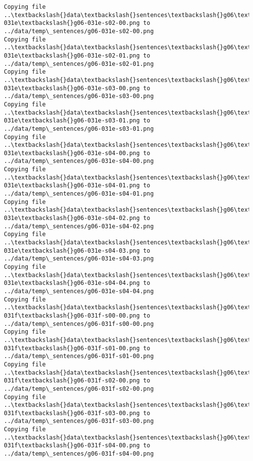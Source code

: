 \documentclass[11pt]{article}
\begin{document}
\begin{Verbatim}[commandchars=\\\{\}]
Copying file ..\textbackslash{}data\textbackslash{}sentences\textbackslash{}g06\textbackslash{}g06-031e\textbackslash{}g06-031e-s02-00.png to
../data/temp\_sentences/g06-031e-s02-00.png
Copying file ..\textbackslash{}data\textbackslash{}sentences\textbackslash{}g06\textbackslash{}g06-031e\textbackslash{}g06-031e-s02-01.png to
../data/temp\_sentences/g06-031e-s02-01.png
Copying file ..\textbackslash{}data\textbackslash{}sentences\textbackslash{}g06\textbackslash{}g06-031e\textbackslash{}g06-031e-s03-00.png to
../data/temp\_sentences/g06-031e-s03-00.png
Copying file ..\textbackslash{}data\textbackslash{}sentences\textbackslash{}g06\textbackslash{}g06-031e\textbackslash{}g06-031e-s03-01.png to
../data/temp\_sentences/g06-031e-s03-01.png
Copying file ..\textbackslash{}data\textbackslash{}sentences\textbackslash{}g06\textbackslash{}g06-031e\textbackslash{}g06-031e-s04-00.png to
../data/temp\_sentences/g06-031e-s04-00.png
Copying file ..\textbackslash{}data\textbackslash{}sentences\textbackslash{}g06\textbackslash{}g06-031e\textbackslash{}g06-031e-s04-01.png to
../data/temp\_sentences/g06-031e-s04-01.png
Copying file ..\textbackslash{}data\textbackslash{}sentences\textbackslash{}g06\textbackslash{}g06-031e\textbackslash{}g06-031e-s04-02.png to
../data/temp\_sentences/g06-031e-s04-02.png
Copying file ..\textbackslash{}data\textbackslash{}sentences\textbackslash{}g06\textbackslash{}g06-031e\textbackslash{}g06-031e-s04-03.png to
../data/temp\_sentences/g06-031e-s04-03.png
Copying file ..\textbackslash{}data\textbackslash{}sentences\textbackslash{}g06\textbackslash{}g06-031e\textbackslash{}g06-031e-s04-04.png to
../data/temp\_sentences/g06-031e-s04-04.png
Copying file ..\textbackslash{}data\textbackslash{}sentences\textbackslash{}g06\textbackslash{}g06-031f\textbackslash{}g06-031f-s00-00.png to
../data/temp\_sentences/g06-031f-s00-00.png
Copying file ..\textbackslash{}data\textbackslash{}sentences\textbackslash{}g06\textbackslash{}g06-031f\textbackslash{}g06-031f-s01-00.png to
../data/temp\_sentences/g06-031f-s01-00.png
Copying file ..\textbackslash{}data\textbackslash{}sentences\textbackslash{}g06\textbackslash{}g06-031f\textbackslash{}g06-031f-s02-00.png to
../data/temp\_sentences/g06-031f-s02-00.png
Copying file ..\textbackslash{}data\textbackslash{}sentences\textbackslash{}g06\textbackslash{}g06-031f\textbackslash{}g06-031f-s03-00.png to
../data/temp\_sentences/g06-031f-s03-00.png
Copying file ..\textbackslash{}data\textbackslash{}sentences\textbackslash{}g06\textbackslash{}g06-031f\textbackslash{}g06-031f-s04-00.png to
../data/temp\_sentences/g06-031f-s04-00.png

\end{Verbatim}
\end{document}
